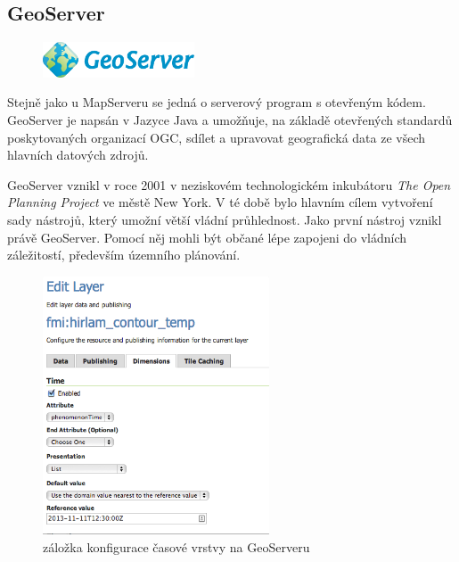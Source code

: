 \newpage
\subsection{GeoServer}

\begin{figure}[h!]  \centering
\includegraphics[width=0.4\textwidth]{../img/geoserver-logo.png}
	\label{fig:geoserver-logo}
\end{figure} \bigskip

Stejně jako u MapServeru se jedná o serverový program s otevřeným
kódem. GeoServer je napsán v Jazyce Java a umožňuje, na základě
otevřených standardů poskytovaných organizací OGC, sdílet a upravovat
geografická data ze všech hlavních datových zdrojů.

GeoServer vznikl v roce 2001 v neziskovém technologickém inkubátoru
\textit{The Open Planning Project} ve městě New York. V té době bylo
hlavním cílem vytvoření sady nástrojů, který umožní větší vládní
průhlednost. Jako první nástroj vznikl právě GeoServer. Pomocí něj
mohli být občané lépe zapojeni do vládních záležitostí, především
územního plánování.

\begin{figure}[h!]  \centering
\includegraphics[width=0.6\textwidth]{../img/geoserver-layer-edit.png}
	\caption{záložka konfigurace časové vrstvy na GeoServeru
\cite{geoserver-layer-edit}}
	\label{fig:geoserver-layer-edit}
\end{figure}

\bigskip
\noindent

